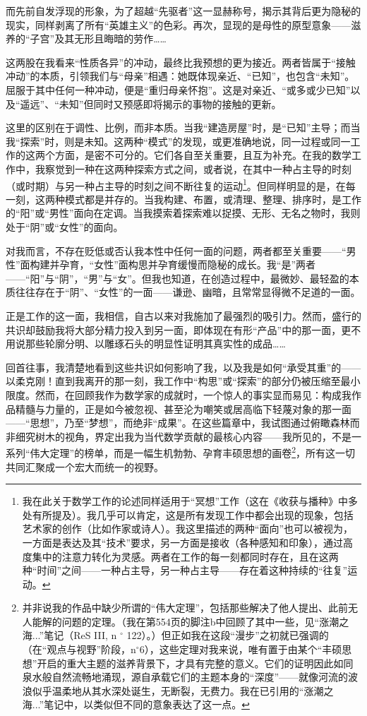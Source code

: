 而先前自发浮现的形象，为了超越“先驱者”这一显赫称号，揭示其背后更为隐秘的现实，同样剥离了所有“英雄主义”的色彩。再次，显现的是母性的原型意象——滋养的“子宫”及其无形且晦暗的劳作……

这两股在我看来“性质各异”的冲动，最终比我预想的更为接近。两者皆属于“接触冲动”的本质，引领我们与“母亲”相遇：她既体现亲近、“已知”，也包含“未知”。屈服于其中任何一种冲动，便是“重归母亲怀抱”。这是对亲近、“或多或少已知”以及“遥远”、“未知”但同时又预感即将揭示的事物的接触的更新。

这里的区别在于调性、比例，而非本质。当我“建造房屋”时，是“已知”主导；而当我“探索”时，则是未知。这两种“模式”的发现，或更准确地说，同一过程或同一工作的这两个方面，是密不可分的。它们各自至关重要，且互为补充。在我的数学工作中，我察觉到一种在这两种探索方式之间，或者说，在其中一种占主导的时刻（或时期）与另一种占主导的时刻之间不断往复的运动\footnote{我在此关于数学工作的论述同样适用于“冥想”工作（这在《收获与播种》中多处有所提及）。我几乎可以肯定，这是所有发现工作中都会出现的现象，包括艺术家的创作（比如作家或诗人）。我这里描述的两种“面向”也可以被视为，一方面是表达及其“技术”要求，另一方面是接收（各种感知和印象），通过高度集中的注意力转化为灵感。两者在工作的每一刻都同时存在，且在这两种“时间”之间——一种占主导，另一种占主导——存在着这种持续的“往复”运动。}。但同样明显的是，在每一刻，这两种模式都是并存的。当我构建、布置，或清理、整理、排序时，是工作的“阳”或“男性”面向在定调。当我摸索着探索难以捉摸、无形、无名之物时，我则处于“阴”或“女性”的面向。

对我而言，不存在贬低或否认我本性中任何一面的问题，两者都至关重要——“男性”面构建并孕育，“女性”面构思并孕育缓慢而隐秘的成长。我“是”两者——“阳”与“阴”，“男”与“女”。但我也知道，在创造过程中，最微妙、最轻盈的本质往往存在于“阴”、“女性”的一面——谦逊、幽暗，且常常显得微不足道的一面。

正是工作的这一面，我相信，自古以来对我施加了最强烈的吸引力。然而，盛行的共识却鼓励我将大部分精力投入到另一面，即体现在有形“产品”中的那一面，更不用说那些轮廓分明、以雕琢石头的明显性证明其真实性的成品……

回首往事，我清楚地看到这些共识如何影响了我，以及我是如何“承受其重”的——以柔克刚！直到我离开的那一刻，我工作中“构思”或“探索”的部分仍被压缩至最小限度。然而，在回顾我作为数学家的成就时，一个惊人的事实显而易见：构成我作品精髓与力量的，正是如今被忽视、甚至沦为嘲笑或居高临下轻蔑对象的那一面——“思想”，乃至“梦想”，而绝非“成果”。在这些篇章中，我试图通过俯瞰森林而非细究树木的视角，界定出我为当代数学贡献的最核心内容——我所见的，不是一系列“伟大定理”的榜单，而是一幅生机勃勃、孕育丰硕思想的画卷\footnote{并非说我的作品中缺少所谓的“伟大定理”，包括那些解决了他人提出、此前无人能解的问题的定理。（我在第554页的脚注b中回顾了其中一些，见“涨潮之海...”笔记（ReS III, n ${ }^{\circ}$ 122）。）但正如我在这段“漫步”之初就已强调的（在“观点与视野”阶段，$\mathrm{n}^{\circ} 6$），这些定理对我来说，唯有置于由某个“丰硕思想”开启的重大主题的滋养背景下，才具有完整的意义。它们的证明因此如同泉水般自然流畅地涌现，源自承载它们的主题本身的“深度”——就像河流的波浪似乎温柔地从其水深处诞生，无断裂，无费力。我在已引用的“涨潮之海...”笔记中，以类似但不同的意象表达了这一点。}，所有这一切共同汇聚成一个宏大而统一的视野。